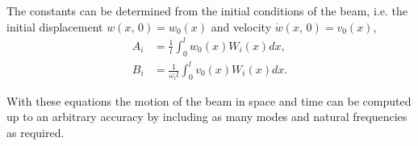 The constants can be determined from the initial conditions of the beam, i.e. the initial displacement $w(x,\,0) = w_{0}(x)$ and velocity $\dot{w}(x,\,0) = v_{0}(x)$,
%
\begin{align}
A_{i} &= \frac{1}{l}\int_{0}^{l} w_{0}(x)W_{i}(x) dx, \\
B_{i} &= \frac{1}{\omega_{i}l}\int_{0}^{l} v_{0}(x)W_{i}(x) dx.
\end{align}

With these equations the motion of the beam in space and time can be computed up to an arbitrary accuracy by including as many modes and natural frequencies as required.